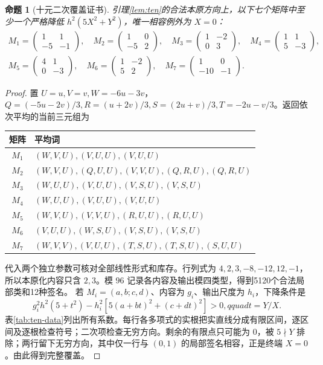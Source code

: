 \documentclass[11pt,a4paper]{article}
\newtheorem{proposition}[theorem]{命题}
\theoremstyle{definition}
\numberwithin{equation}{section}
\begin{document}
\begin{proposition}[十元二次覆盖证书]\label{prop:ten-certificate}
引理\ref{lem:ten}的合法本原方向上，以下七个矩阵中至少一个严格降低 $h^2(5X^2+Y^2)$，唯一相容例外为 $X=0$：
\[
\begin{gathered}
M_1=\begin{pmatrix}1&1\\-5&-1\end{pmatrix},\quad
M_2=\begin{pmatrix}1&0\\-5&2\end{pmatrix},\quad
M_3=\begin{pmatrix}1&-2\\0&3\end{pmatrix},\quad
M_4=\begin{pmatrix}1&1\\5&-3\end{pmatrix},\\
M_5=\begin{pmatrix}4&1\\0&-3\end{pmatrix},\quad
M_6=\begin{pmatrix}1&-2\\5&2\end{pmatrix},\quad
M_7=\begin{pmatrix}1&0\\-10&-1\end{pmatrix}.
\end{gathered}
\]
\end{proposition}
\begin{proof}
置 $U=u,V=v,W=-6u-3v$，$Q=(-5u-2v)/3,R=(u+2v)/3,S=(2u+v)/3,T=-2u-v/3$。返回依次平均的当前三元组为
\begin{center}\small
\begin{tabular}{cl}\toprule
矩阵&平均词\\\midrule
$M_1$&$(W,V,U),(V,U,U),(V,U,U)$\\
$M_2$&$(W,V,U),(Q,U,U),(V,V,U),(Q,R,U),(Q,R,U)$\\
$M_3$&$(W,U,U),(V,U,U),(V,S,U),(V,S,U)$\\
$M_4$&$(W,U,U),(V,U,U),(V,U,U)$\\
$M_5$&$(W,V,U),(V,V,U),(R,U,U),(R,U,U)$\\
$M_6$&$(V,U,U),(W,S,U),(V,S,U),(V,S,U)$\\
$M_7$&$(W,V,V),(V,U,U),(T,S,U),(T,S,U),(S,U,U)$\\\bottomrule
\end{tabular}\end{center}
代入两个独立参数可核对全部线性形式和库存。行列式为 $4,2,3,-8,-12,12,-1$，所以本原化内容只含 $2,3$。模 $96$ 记录各内容及输出模四类型，得到5120个合法局部类和12种签名。
若 $M_i=(a,b;c,d)$、内容为 $g_i$、输出尺度为 $h_i$，下降条件是
\[
g_i^2h^2(5+t^2)-h_i^2[5(a+bt)^2+(c+dt)^2]>0,qquad t=Y/X.
\]
表\ref{tab:ten-data}列出所有系数。每行各多项式的实根把实直线分成有限区间，逐区间及逐根检查符号；二次项检查无穷方向。剩余的有限点只可能为 $0$，被 $5\nmid Y$ 排除；两行留下无穷方向，其中仅一行与 $(0,1)$ 的局部签名相容，正是终端 $X=0$。由此得到完整覆盖。
\end{proof}
\end{document}
